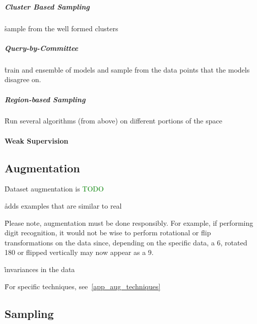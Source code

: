 \subparagraph{Cluster Based Sampling}

\r{sample from the well formed clusters}

\subparagraph{Query-by-Committee}

\r{train and ensemble of models and sample from the data points that the models disagree on.}

\subparagraph{Region-based Sampling}

\r{Run several algorithms (from above) on different portions of the space}


\paragraph{Weak Supervision}




\subsection{Augmentation}

\r{Dataset augmentation is \textcolor{green}{TODO}}

\r{adds examples that are similar to real}


\r{Please note, augmentation must be done responsibly. For example, if performing digit recognition, it would not be wise to perform rotational or flip transformations on the data since, depending on the specific data, a 6, rotated 180 or flipped vertically may now appear as a 9.}


\r{invariances in the data}

\r{For specific techniques, see~\ref{app_aug_techniques}}



\subsection{Sampling}

